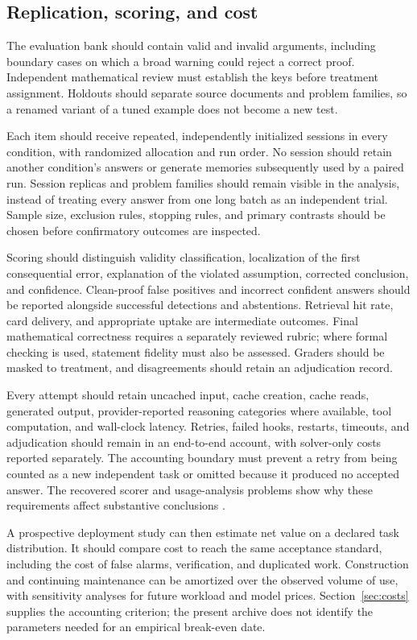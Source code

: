 \subsection{Replication, scoring, and cost}

The evaluation bank should contain valid and invalid arguments, including boundary cases on which a broad warning could reject a correct proof. Independent mathematical review must establish the keys before treatment assignment. Holdouts should separate source documents and problem families, so a renamed variant of a tuned example does not become a new test.

Each item should receive repeated, independently initialized sessions in every condition, with randomized allocation and run order. No session should retain another condition's answers or generate memories subsequently used by a paired run. Session replicas and problem families should remain visible in the analysis, instead of treating every answer from one long batch as an independent trial. Sample size, exclusion rules, stopping rules, and primary contrasts should be chosen before confirmatory outcomes are inspected.

Scoring should distinguish validity classification, localization of the first consequential error, explanation of the violated assumption, corrected conclusion, and confidence. Clean-proof false positives and incorrect confident answers should be reported alongside successful detections and abstentions. Retrieval hit rate, card delivery, and appropriate uptake are intermediate outcomes. Final mathematical correctness requires a separately reviewed rubric; where formal checking is used, statement fidelity must also be assessed. Graders should be masked to treatment, and disagreements should retain an adjudication record.

Every attempt should retain uncached input, cache creation, cache reads, generated output, provider-reported reasoning categories where available, tool computation, and wall-clock latency. Retries, failed hooks, restarts, timeouts, and adjudication should remain in an end-to-end account, with solver-only costs reported separately. The accounting boundary must prevent a retry from being counted as a new independent task or omitted because it produced no accepted answer. The recovered scorer and usage-analysis problems show why these requirements affect substantive conclusions \citep{ab30analyze,ab30deviation,ledgerbuilder}.

A prospective deployment study can then estimate net value on a declared task distribution. It should compare cost to reach the same acceptance standard, including the cost of false alarms, verification, and duplicated work. Construction and continuing maintenance can be amortized over the observed volume of use, with sensitivity analyses for future workload and model prices. Section~\ref{sec:costs} supplies the accounting criterion; the present archive does not identify the parameters needed for an empirical break-even date.

